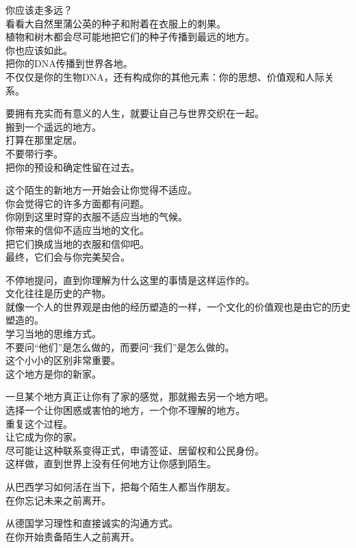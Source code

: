\documentclass[
]{article}
\begin{document}
你应该走多远？\\
看看大自然里蒲公英的种子和附着在衣服上的刺果。\\
植物和树木都会尽可能地把它们的种子传播到最远的地方。\\
你也应该如此。\\
把你的DNA传播到世界各地。\\
不仅仅是你的生物DNA，还有构成你的其他元素：你的思想、价值观和人际关系。

要拥有充实而有意义的人生，就要让自己与世界交织在一起。\\
搬到一个遥远的地方。\\
打算在那里定居。\\
不要带行李。\\
把你的预设和确定性留在过去。

这个陌生的新地方一开始会让你觉得不适应。\\
你会觉得它的许多方面都有问题。\\
你刚到这里时穿的衣服不适应当地的气候。\\
你带来的信仰不适应当地的文化。\\
把它们换成当地的衣服和信仰吧。\\
最终，它们会与你完美契合。

不停地提问，直到你理解为什么这里的事情是这样运作的。\\
文化往往是历史的产物。\\
就像一个人的世界观是由他的经历塑造的一样，一个文化的价值观也是由它的历史塑造的。\\
学习当地的思维方式。\\
不要问``他们''是怎么做的，而要问``我们''是怎么做的。\\
这个小小的区别非常重要。\\
这个地方是你的新家。

一旦某个地方真正让你有了家的感觉，那就搬去另一个地方吧。\\
选择一个让你困惑或害怕的地方，一个你不理解的地方。\\
重复这个过程。\\
让它成为你的家。\\
尽可能让这种联系变得正式，申请签证、居留权和公民身份。\\
这样做，直到世界上没有任何地方让你感到陌生。

从巴西学习如何活在当下，把每个陌生人都当作朋友。\\
在你忘记未来之前离开。

从德国学习理性和直接诚实的沟通方式。\\
在你开始责备陌生人之前离开。
\end{document}
